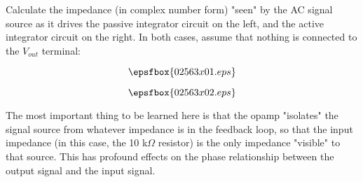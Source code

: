 

Calculate the impedance (in complex number form) "seen" by the AC signal source as it drives the passive integrator circuit on the left, and the active integrator circuit on the right.  In both cases, assume that nothing is connected to the $V_{out}$ terminal:

$$\epsfbox{02563x01.eps}$$







$$\epsfbox{02563x02.eps}$$







The most important thing to be learned here is that the opamp "isolates" the signal source from whatever impedance is in the feedback loop, so that the input impedance (in this case, the 10 k$\Omega$ resistor) is the only impedance "visible" to that source.  This has profound effects on the phase relationship between the output signal and the input signal.




